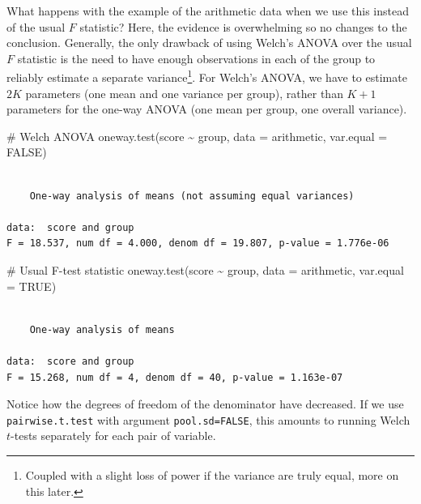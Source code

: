 \documentclass[
  11pt,
  letterpaper,
]{scrbook}
\newenvironment{Shaded}{\begin{snugshade}}{\end{snugshade}}
\newcommand{\AttributeTok}[1]{\textcolor[rgb]{0.40,0.45,0.13}{#1}}
\newcommand{\CommentTok}[1]{\textcolor[rgb]{0.37,0.37,0.37}{#1}}
\newcommand{\ConstantTok}[1]{\textcolor[rgb]{0.56,0.35,0.01}{#1}}
\newcommand{\FunctionTok}[1]{\textcolor[rgb]{0.28,0.35,0.67}{#1}}
\newcommand{\NormalTok}[1]{\textcolor[rgb]{0.00,0.23,0.31}{#1}}
\newcommand{\SpecialCharTok}[1]{\textcolor[rgb]{0.37,0.37,0.37}{#1}}
\theoremstyle{definition}
\theoremstyle{definition}
\theoremstyle{remark}
\begin{document}
What happens with the example of the arithmetic data when we use this
instead of the usual \(F\) statistic? Here, the evidence is overwhelming
so no changes to the conclusion. Generally, the only drawback of using
Welch's ANOVA over the usual \(F\) statistic is the need to have enough
observations in each of the group to reliably estimate a separate
variance\footnote{Coupled with a slight loss of power if the variance
  are truly equal, more on this later.}. For Welch's ANOVA, we have to
estimate \(2K\) parameters (one mean and one variance per group), rather
than \(K+1\) parameters for the one-way ANOVA (one mean per group, one
overall variance).

\begin{Shaded}
\begin{Highlighting}[]
\CommentTok{\# Welch ANOVA}
\FunctionTok{oneway.test}\NormalTok{(score }\SpecialCharTok{\textasciitilde{}}\NormalTok{ group, }\AttributeTok{data =}\NormalTok{ arithmetic, }
            \AttributeTok{var.equal =} \ConstantTok{FALSE}\NormalTok{)}
\end{Highlighting}
\end{Shaded}

\begin{verbatim}

    One-way analysis of means (not assuming equal variances)

data:  score and group
F = 18.537, num df = 4.000, denom df = 19.807, p-value = 1.776e-06
\end{verbatim}

\begin{Shaded}
\begin{Highlighting}[]
\CommentTok{\# Usual F{-}test statistic}
\FunctionTok{oneway.test}\NormalTok{(score }\SpecialCharTok{\textasciitilde{}}\NormalTok{ group, }\AttributeTok{data =}\NormalTok{ arithmetic, }
            \AttributeTok{var.equal =} \ConstantTok{TRUE}\NormalTok{)}
\end{Highlighting}
\end{Shaded}

\begin{verbatim}

    One-way analysis of means

data:  score and group
F = 15.268, num df = 4, denom df = 40, p-value = 1.163e-07
\end{verbatim}

Notice how the degrees of freedom of the denominator have decreased. If
we use \texttt{pairwise.t.test} with argument \texttt{pool.sd=FALSE},
this amounts to running Welch \(t\)-tests separately for each pair of
variable.
\end{document}
